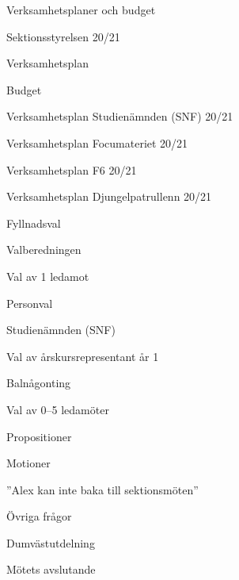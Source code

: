 \documentclass{../sektionsmote} %
\begin{document}
\begin{ootd}
\item{Verksamhetsplaner och budget}
\begin{ootd}
    \item Sektionsstyrelsen 20/21
    \begin{ootd}
        \item Verksamhetsplan
        \item Budget
    \end{ootd}
    \item Verksamhetsplan Studienämnden (SNF) 20/21
    \item Verksamhetsplan Focumateriet 20/21
    \item Verksamhetsplan F6 20/21
    \item Verksamhetsplan Djungelpatrullenn 20/21
\end{ootd}

\item{Fyllnadsval}
\begin{ootd}
    \item Valberedningen
    \begin{ootd}
        \item Val av 1 ledamot
    \end{ootd}
\end{ootd}

\item{Personval}
\begin{ootd}
\item Studienämnden (SNF)
    \begin{ootd}
        \item Val av årskursrepresentant år 1
    \end{ootd}
    \item Balnågonting
    \begin{ootd}
        \item Val av 0--5 ledamöter
    \end{ootd}
\end{ootd}

\item{Propositioner}

\item{Motioner}
\begin{ootd}
    \item ''Alex kan inte baka till sektionsmöten''
\end{ootd}

\item{Övriga frågor}

\item{Dumvästutdelning}

\item{Mötets avslutande}
\end{ootd}
\end{document}
